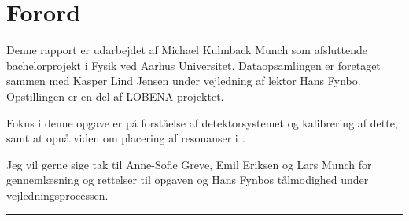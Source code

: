 \begingroup
\let\clearpage\relax
\vspace*{5mm}
\chapter{Forord}
Denne rapport er udarbejdet af Michael Kulmback Munch som afsluttende bachelorprojekt
i Fysik ved Aarhus Universitet. Dataopsamlingen er foretaget sammen med Kasper Lind Jensen under
vejledning af lektor Hans Fynbo. Opstillingen er en del af LOBENA-projektet.

Fokus i denne opgave er på forståelse af detektorsystemet og kalibrering af dette, samt at opnå
viden om placering af resonanser i \Carb.

Jeg vil gerne sige tak til Anne-Sofie Greve, Emil Eriksen og Lars Munch for gennemlæsning og
rettelser til opgaven og Hans Fynbos tålmodighed under vejledningsprocessen. 

\vspace{2\onelineskip}
\noindent
\rule{7cm}{0.4pt}


\endgroup
